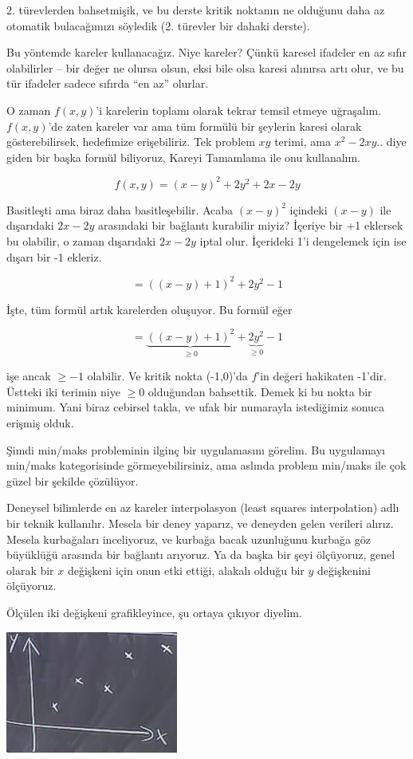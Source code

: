 \documentclass[12pt,fleqn]{article}\usepackage{../../common}
\begin{document}
2. türevlerden bahsetmişik, ve bu derste kritik noktanın ne olduğunu daha
az otomatik bulacağımızı söyledik (2. türevler bir dahaki derste). 

Bu yöntemde kareler kullanacağız. Niye kareler? Çünkü karesel ifadeler en
az sıfır olabilirler -- bir değer ne olursa olsun, eksi bile olsa karesi
alınırsa artı olur, ve bu tür ifadeler sadece sıfırda ``en az'' olurlar.

O zaman $f(x,y)$'i karelerin toplamı olarak tekrar temsil etmeye
uğraşalım. $f(x,y)$'de zaten kareler var ama tüm formülü bir şeylerin
karesi olarak gösterebilirsek, hedefimize erişebiliriz. Tek problem $xy$
terimi, ama $x^2 - 2xy..$ diye giden bir başka formül biliyoruz, Kareyi
Tamamlama ile onu kullanalım.

$$ f(x,y) = (x-y)^2 + 2y^2 + 2x - 2y $$

Basitleşti ama biraz daha basitleşebilir. Acaba $(x-y)^2$ içindeki $(x-y)$
ile dışarıdaki $2x - 2y$ arasındaki bir bağlantı kurabilir miyiz? İçeriye
bir +1 eklersek bu olabilir, o zaman dışarıdaki $2x - 2y$ iptal
olur. İçerideki 1'i dengelemek için ise dışarı bir -1 ekleriz.

$$  = ((x-y) + 1)^2 + 2y^2 - 1$$

İşte, tüm formül artık karelerden oluşuyor. Bu formül eğer 

$$  = \underbrace{((x-y) + 1)^2}_{\ge 0} + \underbrace{2y^2}_{\ge 0} - 1$$

işe ancak $\ge -1$ olabilir. Ve kritik nokta (-1,0)'da $f$'in değeri hakikaten
-1'dir. Üstteki iki terimin niye $\ge 0$ olduğundan bahsettik. Demek ki bu nokta
bir minimum.  Yani biraz cebirsel takla, ve ufak bir numarayla istediğimiz
sonuca erişmiş olduk.

Şimdi min/maks probleminin ilginç bir uygulamasını görelim. Bu uygulamayı
min/maks kategorisinde görmeyebilirsiniz, ama aslında problem min/maks ile
çok güzel bir şekilde çözülüyor.

Deneysel bilimlerde en az kareler interpolasyon (least squares interpolation)
adlı bir teknik kullanılır. Mesela bir deney yaparız, ve deneyden gelen verileri
alırız. Mesela kurbağaları inceliyoruz, ve kurbağa bacak uzunluğunu kurbağa göz
büyüklüğü arasında bir bağlantı arıyoruz. Ya da başka bir şeyi ölçüyoruz, genel
olarak bir $x$ değişkeni için onun etki ettiği, alakalı olduğu bir $y$
değişkenini ölçüyoruz.

Ölçülen iki değişkeni grafikleyince, şu ortaya çıkıyor diyelim.

\begin{center}
\includegraphics[height=4cm]{9_5.png}
\end{center}
\end{document}
